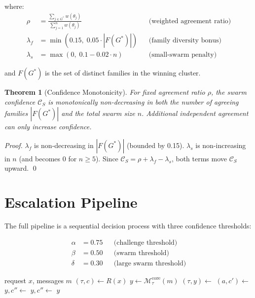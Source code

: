 \documentclass[11pt, a4paper, twocolumn]{article}
\newcommand{\conf}{\mathcal{C}}
\newcommand{\model}{\mathcal{M}}
\newtheorem{theorem}{Theorem}
\begin{document}
where:
\begin{align}
    \rho &= \frac{\displaystyle\sum_{j \in G^*} w(\theta_j)}{\displaystyle\sum_{j=1}^{n} w(\theta_j)} && \text{(weighted agreement ratio)} \\[8pt]
    \lambda_f &= \min\!\left(0.15,\; 0.05 \cdot |F(G^*)|\right) && \text{(family diversity bonus)} \\[4pt]
    \lambda_s &= \max\!\left(0,\; 0.1 - 0.02 \cdot n\right) && \text{(small-swarm penalty)}
\end{align}

and $F(G^*)$ is the set of distinct families in the winning cluster.

\begin{theorem}[Confidence Monotonicity]
For fixed agreement ratio $\rho$, the swarm confidence $\conf_S$ is monotonically non-decreasing in both the number of agreeing families $|F(G^*)|$ and the total swarm size $n$. Additional independent agreement can only increase confidence.
\end{theorem}

\begin{proof}
$\lambda_f$ is non-decreasing in $|F(G^*)|$ (bounded by 0.15). $\lambda_s$ is non-increasing in $n$ (and becomes 0 for $n \geq 5$). Since $\conf_S = \rho + \lambda_f - \lambda_s$, both terms move $\conf_S$ upward. \qed
\end{proof}

\section{Escalation Pipeline}

The full pipeline is a sequential decision process with three confidence thresholds:

\begin{align}
    \alpha &= 0.75 && \text{(challenge threshold)} \\
    \beta  &= 0.50 && \text{(swarm threshold)} \\
    \delta &= 0.30 && \text{(large swarm threshold)}
\end{align}

\begin{algorithm}[H]
\caption{Cortex Process}
\begin{algorithmic}[1]
\Require request $x$, messages $m$
\State $(\tau, c) \gets R(x)$ 
\State $y \gets \model_\tau^{\text{core}}(m)$ 
    \State $(\tau, y) \gets$ 
\EndIf
{} 
    \State $(a, c') \gets$ 
         
            \State $y, c'' \gets$ 
        \Else {}
            \State $y, c'' \gets$ 
        \EndIf
    \EndIf
\EndIf
\State \Return $y$
\end{algorithmic}
\end{algorithm}
\end{document}
